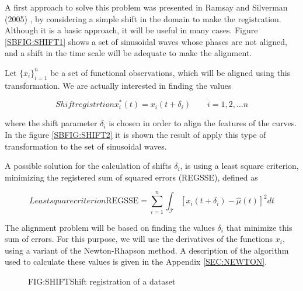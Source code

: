 A first approach to solve this problem was presented in Ramsay and Silverman
(2005) \cite{Ramsay2005}, by considering a simple shift in the domain to make the
registration. Although it is a basic approach, it will be useful in many cases.
Figure \ref{SBFIG:SHIFT1} shows a set of sinusoidal waves whose phases are not
aligned, and a shift in the time scale will be adequate to make the alignment.

Let $\{x_i\}_{i=1}^n$ be a set of functional observations, which will be aligned
using this transformation. We are actually interested in finding the values

\begin{equation}[EQN:SHIFTS]{Shift registrtion}
x_i^*(t)=x_i(t+ \delta_i) \qquad i=1,2, \dots n
\end{equation}

where the shift parameter $\delta_i$ is chosen in order to align the features of
the curves. In the figure \ref{SBFIG:SHIFT2} it is shown the result of apply
this type of transformation to the set of sinusoidal waves.


A possible solution for the calculation of shifts $\delta_i$, is using a least
square criterion, minimizing the registered sum of squared errors (REGSSE),
defined as

\begin{equation}[EQ:REGSSE]{Least square criterion}
\text{REGSSE} = \sum_{i=1}^{n}\int_{\mathcal{T}}\left [x_i(t+\delta_i) - \hat \mu(t) \right ]^2 dt
\end{equation}

The alignment problem will be based on finding the values $\delta_i$ that
minimize this sum of errors. For this purpose,
we will use the derivatives of the functions $x_i$, using a variant of the
Newton-Rhapson method. A description of the algorithm used to calculate these
values is given in the Appendix \ref{SEC:NEWTON}.

\begin{figure}[Shift registration of a dataset]{FIG:SHIFT}{Shift registration of a dataset}
	 \quad
\end{figure}
